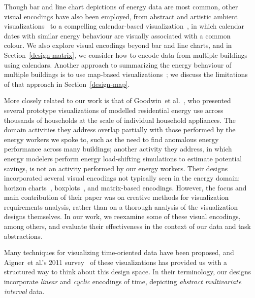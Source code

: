 \documentclass[journal]{vgtc}                %
\newcommand{\bstart}[1]{\vspace{1mm} \noindent{\textbf{#1:}}}
\newcommand{\etal}{et al.}
\begin{document}
Though bar and line chart depictions of energy data are most common, other visual encodings have also been employed, from abstract and artistic ambient visualizations~\cite{Rodgers2011} to a compelling calendar-based visualization~\cite{vanWijk1999}, in which calendar dates with similar energy behaviour are visually associated with a common colour.
We also explore visual encodings beyond bar and line charts, and in Section~\ref{design-matrix}, we consider how to encode data from multiple buildings using calendars.
Another approach to summarizing the energy behaviour of multiple buildings is to use map-based visualizations~\cite{Heat2014,MEP2014}; we discuss the limitations of that approach in Section~\ref{design-map}. 

More closely related to our work is that of Goodwin~\etal~\cite{Goodwin2013}, who presented several prototype visualizations of modelled residential energy use across thousands of households at the scale of individual household appliances. 
The domain activities they address overlap partially with those performed by the energy workers we spoke to, such as the need to find anomalous energy performance across many buildings; another activity they address, in which energy modelers perform energy load-shifting simulations to estimate potential savings, is not an activity performed by our energy workers. 
Their designs incorporated several visual encodings not typically seen in the energy domain: horizon charts~\cite{Heer2009}, boxplots~\cite{Wickham2011}, and matrix-based encodings.
However, the focus and main contribution of their paper was on creative methods for visualization requirements analysis, rather than on a thorough analysis of the visualization designs themselves.
In our work, we reexamine some of these visual encodings, among others, and evaluate their effectiveness in the context of our data and task abstractions. 

\bstart{Visualizing multiple time series} Many techniques for visualizing time-oriented data have been proposed, and Aigner~\etal's 2011 survey~\cite{Aigner2011} of these visualizations has provided us with a structured way to think about this design space.
In their terminology, our designs incorporate {\it linear} and {\it cyclic} encodings of time, depicting {\it abstract multivariate interval} data.
\end{document}

